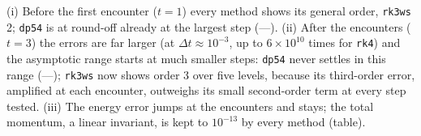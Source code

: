 \documentclass[11pt,a4paper]{article}
\begin{document}
(i) Before the first encounter ($t = 1$) every method shows its general
order, \texttt{rk3ws} 2; \texttt{dp54} is at round-off
already at the largest step (---). (ii) After the encounters ($t = 3$) the
errors are far larger (at $\Delta t \approx 10^{-3}$, up to
$6 \times 10^{10}$ times for \texttt{rk4}) and the asymptotic range starts at
much smaller steps: \texttt{dp54} never settles in this range
(---); \texttt{rk3ws} now shows order 3 over five levels, because its
third-order error, amplified at each encounter, outweighs its small
second-order term at every step tested. (iii) The energy error jumps at the
encounters and stays; the total momentum, a linear invariant, is kept to
$10^{-13}$ by every method (table).
\end{document}
